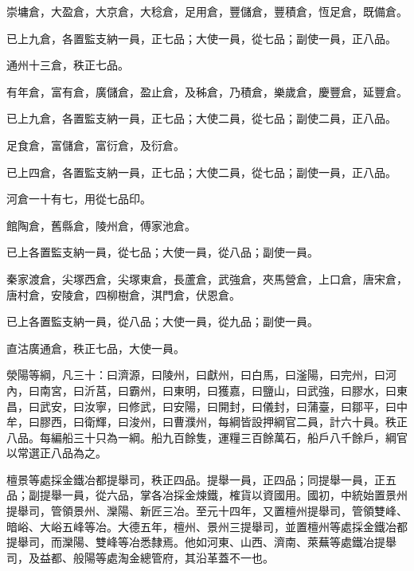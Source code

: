 \begin{pinyinscope}
 崇墉倉，大盈倉，大京倉，大稔倉，足用倉，豐儲倉，豐積倉，恆足倉，既備倉。



 已上九倉，各置監支納一員，正七品；大使一員，從七品；副使一員，正八品。



 通州十三倉，秩正七品。



 有年倉，富有倉，廣儲倉，盈止倉，及秭倉，乃積倉，樂歲倉，慶豐倉，延豐倉。



 已上九倉，各置監支納一員，正七品；大使二員，從七品；副使二員，正八品。



 足食倉，富儲倉，富衍倉，及衍倉。



 已上四倉，各置監支納一員，正七品；大使二員，從七品；副使一員，正八品。



 河倉一十有七，用從七品印。



 館陶倉，舊縣倉，陵州倉，傅家池倉。



 已上各置監支納一員，從七品；大使一員，從八品；副使一員。



 秦家渡倉，尖塚西倉，尖塚東倉，長蘆倉，武強倉，夾馬營倉，上口倉，唐宋倉，唐村倉，安陵倉，四柳樹倉，淇門倉，伏恩倉。



 已上各置監支納一員，從八品；大使一員，從九品；副使一員。



 直沽廣通倉，秩正七品，大使一員。



 滎陽等綱，凡三十：曰濟源，曰陵州，曰獻州，曰白馬，曰滏陽，曰完州，曰河內，曰南宮，曰沂莒，曰霸州，曰東明，曰獲嘉，曰鹽山，曰武強，曰膠水，曰東昌，曰武安，曰汝寧，曰修武，曰安陽，曰開封，曰儀封，曰蒲臺，曰鄒平，曰中牟，曰膠西，曰衛輝，曰浚州，曰曹濮州，每綱皆設押綱官二員，計六十員。秩正八品。每編船三十只為一綱。船九百餘隻，運糧三百餘萬石，船戶八千餘戶，綱官以常選正八品為之。



 檀景等處採金鐵冶都提舉司，秩正四品。提舉一員，正四品；同提舉一員，正五品；副提舉一員，從六品，掌各冶採金煉鐵，榷貨以資國用。國初，中統始置景州提舉司，管領景州、灤陽、新匠三冶。至元十四年，又置檀州提舉司，管領雙峰、暗峪、大峪五峰等冶。大德五年，檀州、景州三提舉司，並置檀州等處採金鐵冶都提舉司，而灤陽、雙峰等冶悉隸焉。他如河東、山西、濟南、萊蕪等處鐵冶提舉司，及益都、般陽等處淘金總管府，其沿革蓋不一也。




\end{pinyinscope}
